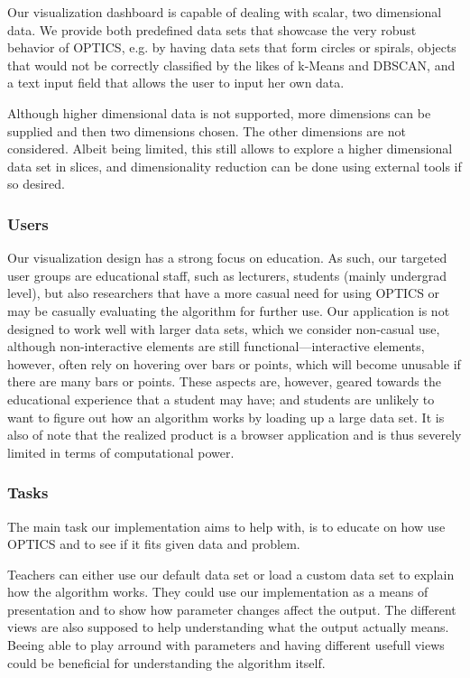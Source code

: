 \documentclass{vgtc}                          %
\begin{document}
Our visualization dashboard is capable of dealing with scalar, two dimensional
data. We provide both predefined data sets that showcase the very robust
behavior of OPTICS, e.g. by having data sets that form circles or spirals,
objects that would not be correctly classified by the likes of k-Means and
DBSCAN, and a text input field that allows the user to input her own data.

Although higher dimensional data is not supported, more dimensions can be
supplied and then two dimensions chosen. The other dimensions are not
considered. Albeit being limited, this still allows to explore a higher
dimensional data set in slices, and dimensionality reduction can be done
using external tools if so desired.

\subsubsection{Users}

Our visualization design has a strong focus on education. As such, our targeted
user groups are educational staff, such as lecturers, students (mainly
undergrad level), but also researchers that have a more casual need for using
OPTICS or may be casually evaluating the algorithm for further use. Our
application is not designed to work well with larger data sets, which we
consider non-casual use, although non-interactive elements are still
functional---interactive elements, however, often rely on hovering over bars or
points, which will become unusable if there are many bars or points. These
aspects are, however, geared towards the educational experience that a student
may have; and students are unlikely to want to figure out how an algorithm
works by loading up a large data set. It is also of note that the realized
product is a browser application and is thus severely limited in terms of
computational power.

\subsubsection{Tasks}
\begin{flushleft}
The main task our implementation aims to help with, is to educate on how use OPTICS and to see if it fits given data and problem.
\end{flushleft}

\begin{flushleft}
Teachers can either use our default data set or load a custom data set to explain how the algorithm works. They could use our implementation as a means of presentation and to show how parameter changes affect the output. The different views are also supposed to help understanding what the output actually means. Beeing able to play arround with parameters and having different usefull views could be beneficial for understanding the algorithm itself.
\end{flushleft}
\end{document}
